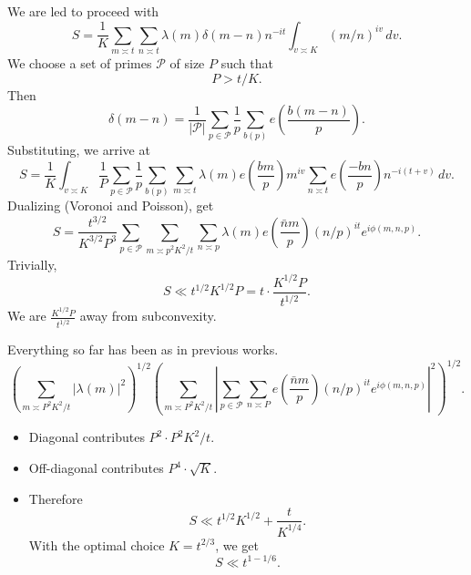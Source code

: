 \documentclass[reqno]{amsart} 
\begin{document}
We are led to proceed with
\begin{equation*}
  S = \frac{1}{K}
  \sum_{m \asymp t} \sum_{n \asymp t}
  \lambda(m)
  \delta(m - n)
  n^{- i t}
  \int_{v \asymp K}
  (m / n)^{i v} \, d v.
\end{equation*}
We choose a set of primes $\mathcal{P}$ of size $P$ such that
\begin{equation*}
  P > t /K.
\end{equation*}
Then
\begin{equation*}
  \delta(m - n) = \frac{1}{\lvert \mathcal{P} \rvert}
  \sum_{p \in \mathcal{P}}
  \frac{1}{p}
  \sum_{b(p)}
  e \left( \frac{b(m - n)}{p} \right).
\end{equation*}
Substituting, we arrive at
\begin{equation*}
  S = \frac{1}{K}
  \int_{v \asymp K}
  \frac{1}{ P}
  \sum_{p \in \mathcal{P}}
  \frac{1}{p} \sum_{b(p)}
  \sum_{m \asymp t}
  \lambda(m)
  e \left( \frac{b m}{p} \right)
  m^{i v}
  \sum_{n \asymp t}
  e \left( \frac{- b n}{p} \right)
  n^{- i(t + v)}
  \, d v.
\end{equation*}
Dualizing (Voronoi and Poisson), get
\begin{equation*}
  S = \frac{t^{3/2}}{K^{3/2} P^3}
  \sum_{p \in \mathcal{P}}
  \sum_{m \asymp p^2 K^2 / t}
  \sum_{n \asymp p}
  \lambda(m)
  e \left( \frac{\bar{n}m}{p} \right)
  (n/p)^{i t}
  e^{i \phi(m, n, p)}.
\end{equation*}
Trivially,
\begin{equation*}
  S \ll t^{1/2} K^{1/2} P = t \cdot \frac{K^{1/2} P}{t^{1/2}}.
\end{equation*}
We are $\frac{K^{1/2} P}{t^{1/2}}$ away from subconvexity.

Everything so far has been as in previous works.
\begin{equation*}
  \left( \sum_{m \asymp P^2 K^2 / t} \left| \lambda(m) \right|^2 \right)^{1/2}
  \left( \sum_{m \asymp P^2 K^2 / t}
    \left| \sum_{p \in \mathcal{P}} \sum_{n \asymp P}
      e \left( \frac{\bar{n} m}{ p} \right)
      (n /p)^{i t} e^{i \phi(m, n, p)}\right|^2\right)^{1/2}.
\end{equation*}
\begin{itemize}
\item Diagonal contributes $P^2 \cdot P^2  K^2 / t$.
\item Off-diagonal contributes $P^4 \cdot \sqrt{K}$.
\item Therefore
  \begin{equation*}
    S \ll t^{1/2} K^{1/2} + \frac{t}{K^{1/4}}.
  \end{equation*}
  With the optimal choice $K = t^{2/3}$, we get
  \begin{equation*}
    S \ll t^{1 - 1/6}.
  \end{equation*}
\end{itemize}
\end{document}

